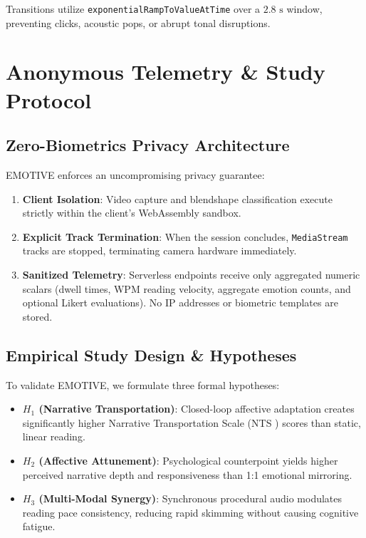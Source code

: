 \documentclass[sigconf,nonacm]{acmart}
\begin{document}
Transitions utilize \texttt{exponentialRampToValueAtTime} over a $2.8\text{ s}$ window, preventing clicks, acoustic pops, or abrupt tonal disruptions.

\section{Anonymous Telemetry \& Study Protocol}

\subsection{Zero-Biometrics Privacy Architecture}

EMOTIVE enforces an uncompromising privacy guarantee:
\begin{enumerate}
    \item \textbf{Client Isolation}: Video capture and blendshape classification execute strictly within the client's WebAssembly sandbox.
    \item \textbf{Explicit Track Termination}: When the session concludes, \texttt{MediaStream} tracks are stopped, terminating camera hardware immediately.
    \item \textbf{Sanitized Telemetry}: Serverless endpoints receive only aggregated numeric scalars (dwell times, WPM reading velocity, aggregate emotion counts, and optional Likert evaluations). No IP addresses or biometric templates are stored.
\end{enumerate}

\subsection{Empirical Study Design \& Hypotheses}

To validate EMOTIVE, we formulate three formal hypotheses:
\begin{itemize}
    \item \textbf{$H_1$ (Narrative Transportation)}: Closed-loop affective adaptation creates significantly higher Narrative Transportation Scale (NTS \cite{green2000transportation}) scores than static, linear reading.
    \item \textbf{$H_2$ (Affective Attunement)}: Psychological counterpoint yields higher perceived narrative depth and responsiveness than 1:1 emotional mirroring.
    \item \textbf{$H_3$ (Multi-Modal Synergy)}: Synchronous procedural audio modulates reading pace consistency, reducing rapid skimming without causing cognitive fatigue.
\end{itemize}
\end{document}
